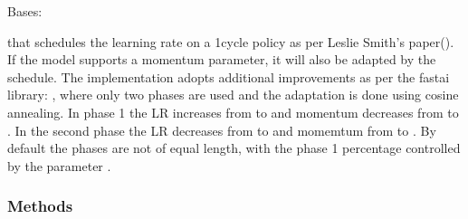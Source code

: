 \documentclass[letterpaper,10pt,english]{sphinxmanual}
\begin{document}
\begin{fulllineitems}
\label{\detokenize{engine/schedulers/one_cycle:engine.schedulers.one_cycle.OneCycleScheduler}}
Bases: 

 that schedules the learning rate on a 1cycle policy as per Leslie Smith’s paper().
If the model supports a momentum parameter, it will also be adapted by the schedule.
The implementation adopts additional improvements as per the fastai library: , where
only two phases are used and the adaptation is done using cosine annealing.
In phase 1 the LR increases from  to  and momentum decreases from  to .
In the second phase the LR decreases from  to  and momemtum from  to .
By default the phases are not of equal length, with the phase 1 percentage controlled by the parameter .
\subsubsection*{Methods}


\begin{savenotes}\sphinxatlongtablestart\begin{longtable}[c]{}
\hline

\endfirsthead

%
{}\\
\hline

\endhead

\hline
{}\\
\endfoot


\end{longtable}
\end{savenotes}
\end{fulllineitems}
\end{document}
